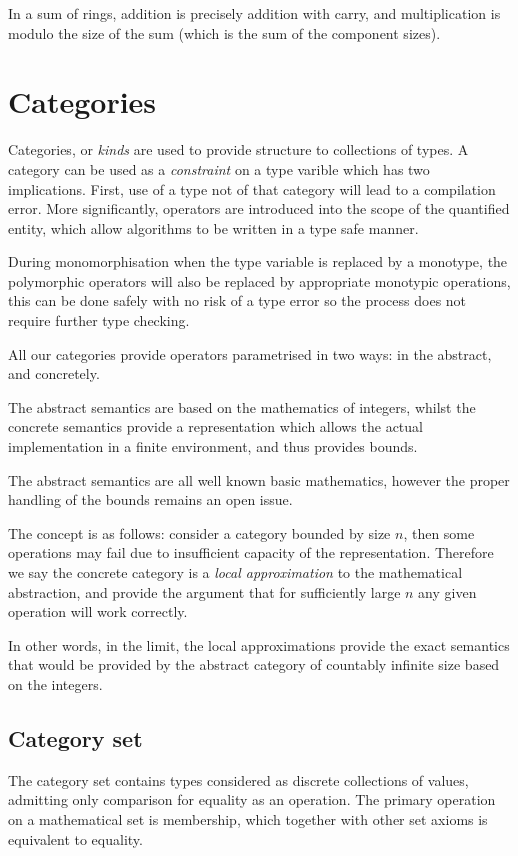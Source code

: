 \documentclass[oneside]{book}
\theoremstyle{plain}
\theoremstyle{definition}
\theoremstyle{plain}
\begin{document}
In a sum of rings, addition is precisely addition with carry,
and multiplication is modulo the size of the sum (which is the
sum of the component sizes).

\chapter{Categories}
Categories, or {\em kinds} are used to provide structure to collections of types.
A category can be used as a {\em constraint} on a type varible which has two
implications. First, use of a type not of that category will lead to a compilation
error. More significantly, operators are introduced into the scope of the quantified
entity, which allow algorithms to be written in a type safe manner.

During monomorphisation when the type variable is replaced by a monotype,
the polymorphic operators will also be replaced by appropriate monotypic
operations, this can be done safely with no risk of a type error so
the process does not require further type checking.

All our categories provide operators parametrised in two ways:
in the abstract, and concretely.

The abstract semantics are based on the mathematics of integers,
whilst the concrete semantics provide a representation which
allows the actual implementation in a finite environment,
and thus provides bounds.

The abstract semantics are all well known basic mathematics,
however the proper handling of the bounds remains an open issue.

The concept is as follows: consider a category bounded by size $n$,
then some operations may fail due to insufficient capacity of
the representation. Therefore we say the concrete category is 
a {\em local approximation} to the mathematical abstraction,
and provide the argument that for sufficiently large $n$ any
given operation will work correctly.

In other words, in the limit, the local approximations provide
the exact semantics that would be provided by the abstract category
of countably infinite size based on the integers.

\section{Category set}
The category set contains types considered as discrete collections
of values, admitting only comparison for equality as an operation.
The primary operation on a mathematical set is membership, which together
with other set axioms is equivalent to equality.
\end{document}
